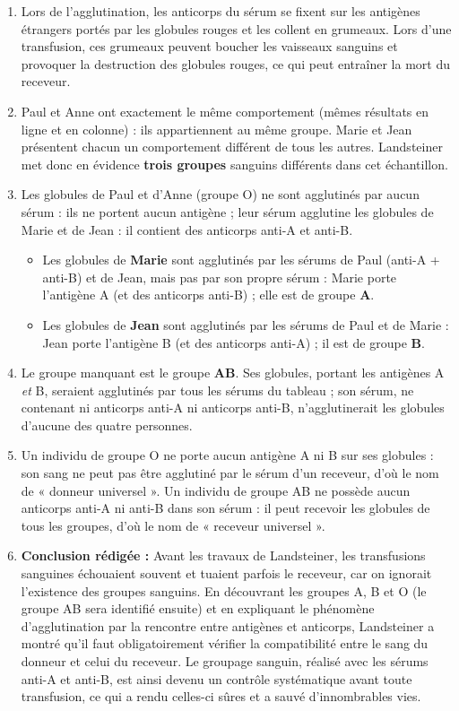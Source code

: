 \documentclass[11pt]{article}
\newcommand{\cle}[1]{{\popxbold\color{popdark}#1}}
\begin{document}
\begin{corrige}
\begin{enumerate}
\item Lors de l'agglutination, les anticorps du sérum se fixent sur les antigènes étrangers portés par les globules rouges et les collent en grumeaux. Lors d'une transfusion, ces grumeaux peuvent boucher les vaisseaux sanguins et provoquer la destruction des globules rouges, ce qui peut entraîner la mort du receveur.
\item Paul et Anne ont exactement le même comportement (mêmes résultats en ligne et en colonne) : ils appartiennent au même groupe. Marie et Jean présentent chacun un comportement différent de tous les autres. Landsteiner met donc en évidence \textbf{trois groupes} sanguins différents dans cet échantillon.
\item Les globules de Paul et d'Anne (groupe O) ne sont agglutinés par aucun sérum : ils ne portent aucun antigène ; leur sérum agglutine les globules de Marie et de Jean : il contient des anticorps anti-A et anti-B.
\begin{itemize}
\item Les globules de \textbf{Marie} sont agglutinés par les sérums de Paul (anti-A + anti-B) et de Jean, mais pas par son propre sérum : Marie porte l'antigène A (et des anticorps anti-B) ; elle est de groupe \textbf{A}.
\item Les globules de \textbf{Jean} sont agglutinés par les sérums de Paul et de Marie : Jean porte l'antigène B (et des anticorps anti-A) ; il est de groupe \textbf{B}.
\end{itemize}
\item Le groupe manquant est le groupe \textbf{AB}. Ses globules, portant les antigènes A \emph{et} B, seraient agglutinés par tous les sérums du tableau ; son sérum, ne contenant ni anticorps anti-A ni anticorps anti-B, n'agglutinerait les globules d'aucune des quatre personnes.
\item Un individu de groupe O ne porte aucun antigène A ni B sur ses globules : son sang ne peut pas être agglutiné par le sérum d'un receveur, d'où le nom de « \cle{donneur universel} ». Un individu de groupe AB ne possède aucun anticorps anti-A ni anti-B dans son sérum : il peut recevoir les globules de tous les groupes, d'où le nom de « \cle{receveur universel} ».
\item \textbf{Conclusion rédigée :} Avant les travaux de Landsteiner, les transfusions sanguines échouaient souvent et tuaient parfois le receveur, car on ignorait l'existence des groupes sanguins. En découvrant les groupes A, B et O (le groupe AB sera identifié ensuite) et en expliquant le phénomène d'agglutination par la rencontre entre antigènes et anticorps, Landsteiner a montré qu'il faut obligatoirement vérifier la compatibilité entre le sang du donneur et celui du receveur. Le groupage sanguin, réalisé avec les sérums anti-A et anti-B, est ainsi devenu un contrôle systématique avant toute transfusion, ce qui a rendu celles-ci sûres et a sauvé d'innombrables vies.

\end{enumerate}
\end{corrige}
\end{document}
